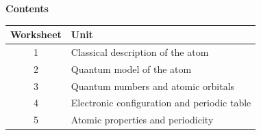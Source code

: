 {\sffamily\bfseries\color{heading} Contents}\par\vspace{2mm}
\begin{center}
\renewcommand{\arraystretch}{1.3}
\begin{tabular}{@{}c l@{}}
\toprule
Worksheet & Unit\\ \midrule
1 & Classical description of the atom\\
2 & Quantum model of the atom\\
3 & Quantum numbers and atomic orbitals\\
4 & Electronic configuration and periodic table\\
5 & Atomic properties and periodicity\\ \bottomrule
\end{tabular}
\end{center}
